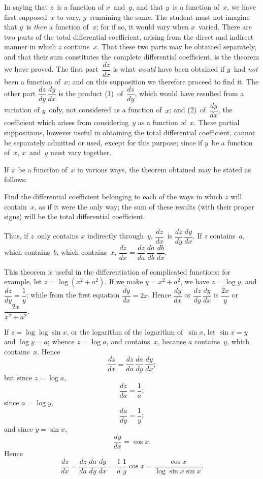 \documentclass[12pt]{book}[2005/09/16]
\newcommand{\Pagelabel}[1]{\phantomsection\label{page:#1}}
\newcommand{\PageSep}[1]{\Pagelabel{#1}\ignorespaces}
\renewcommand{\(}{{\upshape(}}
\renewcommand{\)}{{\upshape)}}
\begin{document}
In saying that $z$~is a function of $x$~and~$y$, and that
$y$~is a function of~$x$, we have first supposed~$x$ to vary,
$y$~remaining the same. The student must not imagine
that $y$~is \emph{then} a function of~$x$; for if so, it would vary
when $x$~varied. There are two parts of the total differential
coefficient, arising from the direct and indirect
manner in which $z$ contains~$x$. That these two
parts may be obtained separately, and that their sum
constitutes the complete differential coefficient, is the
theorem we have proved. The first part~$\dfrac{dz}{dx}$ is what
\emph{would} have been obtained if $y$~had \emph{not} been a function
of~$x$; and on this supposition we therefore proceed to
find it. The other part $\dfrac{dz}{dy}\, \dfrac{dy}{dx}$ is the product (1)~of~$\dfrac{dz}{dy}$,
which would have resulted from a variation of $y$~only,
not considered as a function of~$x$; and (2)~of~$\dfrac{dy}{dx}$,
\PageSep{100}
the coefficient which arises from considering~$y$ as a
function of~$x$. These partial suppositions, however
useful in obtaining the total differential coefficient,
%
%
cannot be separately admitted or used, except for this
purpose; since if $y$~be a function of~$x$, $x$~and~$y$ must
vary together.

If $z$~be a function of~$x$ in various ways, the theorem
obtained may be stated as follows:

Find the differential coefficient belonging to each
of the ways in which $z$ will contain~$x$, as if it were the
only way; the sum of these results (with their proper
signs) will be the total differential coefficient.

Thus, if $z$~only contains $x$ indirectly through~$y$,
$\dfrac{dz}{dx}$~is $\dfrac{dz}{dy}\, \dfrac{dy}{dx}$. If $z$ contains~$a$, which contains~$b$, which
contains~$x$, $\dfrac{dz}{dx} = \dfrac{dz}{da}\, \dfrac{da}{db}\, \dfrac{db}{dx}$.

This theorem is useful in the differentiation of complicated
%
functions; for example, let $z = \log(x^{2} + a^{2})$.
If we make $y = x^{2} + a^{2}$, we have $z = \log y$, and $\dfrac{dz}{dy} = \dfrac{1}{y}$;
while from the first equation $\dfrac{dy}{dx} = 2x$. Hence $\dfrac{dy}{dx}$ or
$\dfrac{dz}{dy}\, \dfrac{dy}{dx}$ is $\dfrac{2x}{y}$ or $\dfrac{2x}{x^{2} + a^{2}}$.

If $z = \log\log\sin x$, or the logarithm of the logarithm
of~$\sin x$, let $\sin x = y$ and $\log y = a$; whence
$z= \log a$, and contains~$x$, because $a$ contains~$y$, which
contains~$x$. Hence
\[
\frac{dz}{dx} = \frac{dz}{da}\, \frac{da}{dy}\, \frac{dy}{dx};
\]
but since $z = \log a$,
\[
\frac{dz}{da} = \frac{1}{a};
\]
\PageSep{101}
since $a = \log y$,
\[
\frac{da}{dy} = \frac{1}{y};
\]
and since $y = \sin x$,
\[
\frac{dy}{dx} = \cos x.
\]
Hence
\[
\frac{dz}{dx} = \frac{dz}{da}\, \frac{da}{dy}\, \frac{dy}{dx}
  = \frac{1}{a}\, \frac{1}{y} \cos x
  = \frac{\cos x}{\log\sin x \sin x}.
\]
\end{document}
